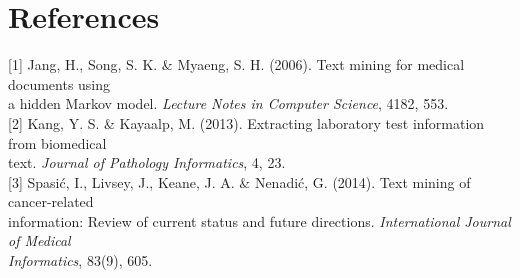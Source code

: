 \documentclass[11pt]{article}
\begin{document}
\newpage


\section{References} \label{references}

[1] Jang, H., Song, S. K. \& Myaeng, S. H. (2006). Text mining for medical documents using \\ \hspace*{10mm} a hidden
Markov model. \textit{Lecture Notes in Computer Science}, 4182, 553.
\\

[2] Kang, Y. S. \& Kayaalp, M. (2013). Extracting laboratory test information from biomedical \\ \hspace*{10mm} text. \textit{Journal of Pathology Informatics}, 4, 23.
\\

[3] Spasi\'c, I., Livsey, J., Keane, J. A. \& Nenadi\'c, G. (2014). Text mining of cancer-related \\ \hspace*{10mm} information: Review of current status and future directions. \textit{International Journal of Medical \\ \hspace*{10mm} Informatics}, 83(9), 605.
\end{document}
